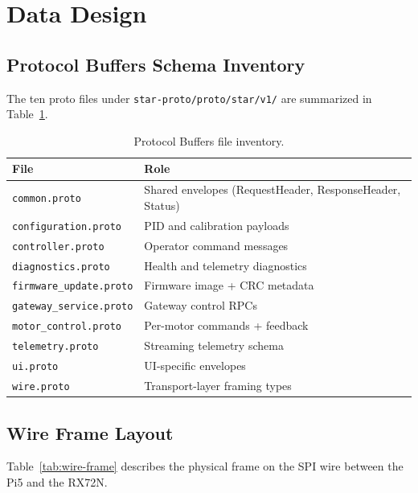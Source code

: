 \documentclass[11pt,letterpaper]{article}
\begin{document}
\section{Data Design}
\label{sec:data-design}

\subsection{Protocol Buffers Schema Inventory}
The ten proto files under \texttt{star-proto/proto/star/v1/} are
summarized in Table~\ref{tab:proto-inventory}.

\begin{table}[H]
\centering
\caption{Protocol Buffers file inventory.}
\label{tab:proto-inventory}
\small
\begin{tabularx}{\linewidth}{l X}
\toprule
\textbf{File} & \textbf{Role} \\
\midrule
\texttt{common.proto}           & Shared envelopes (RequestHeader,
                                  ResponseHeader, Status) \\
\texttt{configuration.proto}    & PID and calibration payloads \\
\texttt{controller.proto}       & Operator command messages \\
\texttt{diagnostics.proto}      & Health and telemetry diagnostics \\
\texttt{firmware\_update.proto} & Firmware image + CRC metadata \\
\texttt{gateway\_service.proto} & Gateway control RPCs \\
\texttt{motor\_control.proto}  & Per-motor commands + feedback \\
\texttt{telemetry.proto}        & Streaming telemetry schema \\
\texttt{ui.proto}               & UI-specific envelopes \\
\texttt{wire.proto}             & Transport-layer framing types \\
\bottomrule
\end{tabularx}
\end{table}

\subsection{Wire Frame Layout}
Table~\ref{tab:wire-frame} describes the physical frame on the SPI
wire between the Pi5 and the RX72N.
\end{document}
